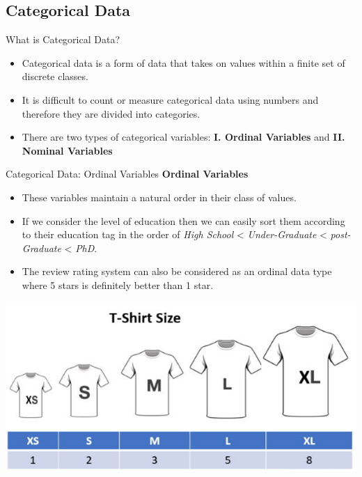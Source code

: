 \documentclass[11pt]{beamer}
\begin{document}
\subsection{Categorical Data \\ \scalebox{0.8}{}}
\begin{frame}{What is Categorical Data?}
	\begin{itemize}
		\item Categorical data is a form of data that takes on values within a finite set of discrete classes. 
		\item It is difficult to count or measure categorical data using numbers and therefore they are divided into categories. 
		\item There are two types of categorical variables: \textbf{I. Ordinal Variables} and \textbf{II. Nominal Variables}
	\end{itemize}
\end{frame}
\begin{frame}{Categorical Data: Ordinal Variables}
\textbf{Ordinal Variables}
	\begin{itemize}
		\item These variables maintain a natural order in their class of values. 
		\item If we consider the level of education then we can easily sort them according to their education tag in the order of \textit{High School} < \textit{ Under-Graduate} < \textit{ post-Graduate} < \textit{ PhD}. 
		\item The review rating system can also be considered as an ordinal data type where 5 stars is definitely better than 1 star.
	\end{itemize}
\begin{center}
\includegraphics[scale=.4]{../05-pictures/lesson-2-1_pic_0.png} 
\end{center}	
\end{frame}
\end{document}
